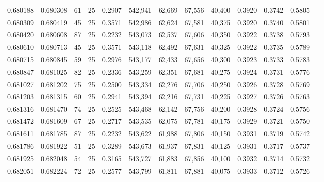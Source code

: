 \begin{tabular}{rrrrrrrrrrrrr}
0.680188 & 0.680308 &    61 &  25 &                                     0.2907 & 542,941 &  62,669 &  67,556 &  40,400 & 0.3920 & 0.3742 & 0.5805 \\
0.680309 & 0.680419 &    45 &  25 &                                     0.3571 & 542,986 &  62,624 &  67,581 &  40,375 & 0.3920 & 0.3740 & 0.5801 \\
0.680420 & 0.680608 &    87 &  25 &                                     0.2232 & 543,073 &  62,537 &  67,606 &  40,350 & 0.3922 & 0.3738 & 0.5793 \\
0.680610 & 0.680713 &    45 &  25 &                                     0.3571 & 543,118 &  62,492 &  67,631 &  40,325 & 0.3922 & 0.3735 & 0.5789 \\
0.680715 & 0.680845 &    59 &  25 &                                     0.2976 & 543,177 &  62,433 &  67,656 &  40,300 & 0.3923 & 0.3733 & 0.5783 \\
0.680847 & 0.681025 &    82 &  25 &                                     0.2336 & 543,259 &  62,351 &  67,681 &  40,275 & 0.3924 & 0.3731 & 0.5776 \\
0.681027 & 0.681202 &    75 &  25 &                                     0.2500 & 543,334 &  62,276 &  67,706 &  40,250 & 0.3926 & 0.3728 & 0.5769 \\
0.681203 & 0.681315 &    60 &  25 &                                     0.2941 & 543,394 &  62,216 &  67,731 &  40,225 & 0.3927 & 0.3726 & 0.5763 \\
0.681316 & 0.681470 &    74 &  25 &                                     0.2525 & 543,468 &  62,142 &  67,756 &  40,200 & 0.3928 & 0.3724 & 0.5756 \\
0.681472 & 0.681609 &    67 &  25 &                                     0.2717 & 543,535 &  62,075 &  67,781 &  40,175 & 0.3929 & 0.3721 & 0.5750 \\
0.681611 & 0.681785 &    87 &  25 &                                     0.2232 & 543,622 &  61,988 &  67,806 &  40,150 & 0.3931 & 0.3719 & 0.5742 \\
0.681786 & 0.681922 &    51 &  25 &                                     0.3289 & 543,673 &  61,937 &  67,831 &  40,125 & 0.3931 & 0.3717 & 0.5737 \\
0.681925 & 0.682048 &    54 &  25 &                                     0.3165 & 543,727 &  61,883 &  67,856 &  40,100 & 0.3932 & 0.3714 & 0.5732 \\
0.682051 & 0.682224 &    72 &  25 &                                     0.2577 & 543,799 &  61,811 &  67,881 &  40,075 & 0.3933 & 0.3712 & 0.5726 \\

\end{tabular}
